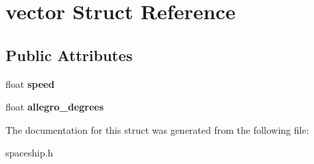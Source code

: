 \hypertarget{structvector}{}\section{vector Struct Reference}
\label{structvector}
\subsection*{Public Attributes}
\begin{DoxyCompactItemize}
\item 
\hypertarget{structvector_acf38d22e0506598d3b441f7b00ef38a1}{}float {\bfseries speed}\label{structvector_acf38d22e0506598d3b441f7b00ef38a1}

\item 
\hypertarget{structvector_ad5b7c158347b32f9d84a27d7435f8704}{}float {\bfseries allegro\+\_\+degrees}\label{structvector_ad5b7c158347b32f9d84a27d7435f8704}

\end{DoxyCompactItemize}


The documentation for this struct was generated from the following file\+:\begin{DoxyCompactItemize}
\item 
spaceship.\+h\end{DoxyCompactItemize}
